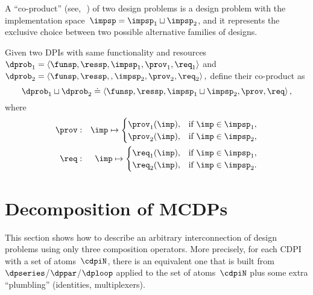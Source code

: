 A ``co-product'' (see,~\eg\,\cite[Section 2.4]{spivak14category})
of two design problems is a design problem with the implementation
space~$\impsp=\impsp_{1}\sqcup\impsp_{2}$, and it represents the
exclusive choice between two possible alternative families of designs.
\begin{definition}[Co-product]
    \label{def:parallel-1}Given two DPIs with same functionality and
    resources $\dprob_{1}=\left\langle \funsp,\ressp,\impsp_{1},\prov_{1},\req_{1}\right\rangle $
    and $\dprob_{2}=\left\langle \funsp,\ressp,,\impsp_{2},\prov_{2},\req_{2}\right\rangle ,$
    define their co-product as
    \[
        \dprob_{1}\sqcup\dprob_{2}\doteq\left\langle \funsp,\ressp,\impsp_{1}\sqcup\impsp_{2},\prov,\req\right\rangle ,
    \]
    where
    \begin{eqnarray}
        \prov & : & \imp\mapsto\begin{cases}
                                   \prov_{1}(\imp), & \text{if }\imp\in\impsp_{1},\\
                                   \prov_{2}(\imp), & \text{if }\imp\in\impsp_{2},
        \end{cases}\label{eq:dppar-exec-1}\\
        \req & : & \imp\mapsto\begin{cases}
                                  \req_{1}(\imp), & \text{if }\imp\in\impsp_{1},\\
                                  \req_{2}(\imp), & \text{if }\imp\in\impsp_{2}.
        \end{cases}\nonumber
    \end{eqnarray}

\end{definition}




\section{Decomposition of MCDPs\label{sec:Decomposition}}

\label{sec:Decomposing2}This section shows how to describe an arbitrary
interconnection of design problems using only three composition operators.
More precisely, for each CDPI with a set of atoms~$\cdpiN$, there
is an equivalent one that is built from $\dpseries$/$\dppar$/$\dploop$
applied to the set of atoms~$\cdpiN$ plus some extra ``plumbling''
(identities, multiplexers).

